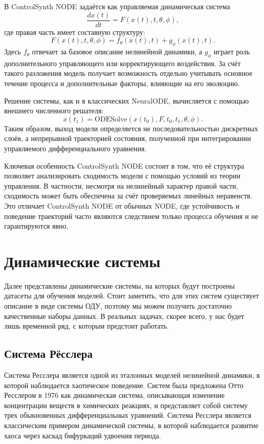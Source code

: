 \documentclass[PMI,VKR]{HSEUniversity}
\begin{document}
В ControlSynth NODE задаётся как управляемая динамическая система
\[
\frac{dx(t)}{dt}=F(x(t),t,\theta,\phi),
\]
где правая часть имеет составную структуру:
\[
F(x(t),t,\theta,\phi)
=
f_{\theta}(x(t),t)+g_{\phi}(x(t),t).
\]
Здесь \(f_{\theta}\) отвечает за базовое описание нелинейной динамики, а \(g_{\phi}\) играет роль дополнительного управляющего или корректирующего воздействия. За счёт такого разложения модель получает возможность отдельно учитывать основное течение процесса и дополнительные факторы, влияющие на его эволюцию.

Решение системы, как и в классических NeuralODE, вычисляется с помощью внешнего численного решателя:
\[
x(t_1)=\mathrm{ODESolve}(x(t_0),F,t_0,t_1,\theta,\phi).
\]
Таким образом, выход модели определяется не последовательностью дискретных слоёв, а непрерывной траекторией состояния, полученной при интегрировании управляемого дифференциального уравнения.

Ключевая особенность ControlSynth NODE состоит в том, что её структура позволяет анализировать сходимость модели с помощью условий из теории управления. 
В частности, несмотря на нелинейный характер правой части, сходимость может быть обеспечена за счёт проверяемых линейных неравенств. Это отличает ControlSynth NODE от обычных NODE, где устойчивость и поведение траекторий часто являются следствием только процесса обучения и не гарантируются явно.

\section{Динамические системы}

Далее представлены динамические системы, на которых будут построены датасеты для обучения моделей. 
Стоит заметить, что для этих систем существует описание в виде системы ОДУ, поэтому мы можем получить достаточно качественные наборы данных.
В реальных задачах, скорее всего, у нас будет лишь временной ряд, с которым предстоит работать.

\subsection{Система Рёсслера}

Система Ресслера является одной из эталонных моделей нелинейной динамики, в которой наблюдается хаотическое поведение. 
Систем была предложена Отто Ресслером в 1976 \cite{rossler1976equation} как динамическая система, описывающая изменение концентрации веществ в химических реакциях, 
и представляет собой систему трех обыкновенных дифференциальных уравнений. 
Система Ресслера является классическим примером динамической системы, в которой наблюдается развитие хаоса через каскад бифуркаций удвоения периода.
\end{document}
